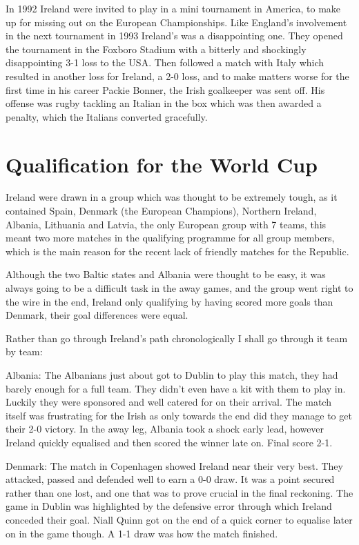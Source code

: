 In 1992 Ireland were invited to play in a mini tournament in America, to make
up for missing out on the European Championships. Like England's involvement
in the next tournament in 1993 Ireland's was a disappointing one. They opened
the tournament in the Foxboro Stadium with a bitterly and shockingly 
disappointing 3-1 loss to the USA. Then followed a match with Italy which
resulted in another loss for Ireland, a 2-0 loss, and to make matters worse
for the first time in his career Packie Bonner, the Irish goalkeeper was sent
off. His offense was rugby tackling an Italian in the box which was then 
awarded a penalty, which the Italians converted gracefully.
\section{Qualification for the World Cup}
Ireland were drawn in a group which was thought to be extremely tough, as it 
contained Spain, Denmark (the European Champions), Northern Ireland, Albania,
Lithuania and Latvia, the only European group with 7 teams, this meant two 
more matches in the qualifying programme for all group members, which is the
main reason for the recent lack of friendly matches for the Republic.

Although the two Baltic states and Albania were thought to be easy, it was 
always going to be a difficult task in the away games, and the group went right
to the wire in the end, Ireland only qualifying by having scored more goals 
than Denmark, their goal differences were equal.  

Rather than go through Ireland's path chronologically I shall go through it
team by team:

Albania: The Albanians just about got to Dublin to play this match, they had 
barely enough for a full team. They didn't even have a kit with them 
to play in. Luckily they were sponsored and well catered for on their
arrival. The match itself was frustrating for the Irish as only 
towards the end did they manage to get their 2-0 victory. In the away
leg, Albania took a shock early lead, however Ireland quickly 
equalised and then scored the winner late on. Final score 2-1.

Denmark: The match in Copenhagen showed Ireland near their very best. They 
attacked, passed and defended well to earn a 0-0 draw. It was a point
secured rather than one lost, and one that was to prove crucial in the
final reckoning. The game in Dublin was highlighted by the defensive 
error through which Ireland conceded their goal. Niall Quinn got on 
the end of a quick corner to equalise later on in the game though. A
1-1 draw was how the match finished.

